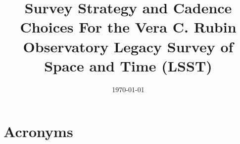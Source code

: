 \documentclass[modern]{aastex62}
\begin{document}


\date{\today}
\title{Survey Strategy and Cadence Choices For the Vera C. Rubin Observatory Legacy Survey of Space and Time (LSST)}



\tableofcontents

\clearpage


\clearpage

\clearpage

\clearpage

\clearpage

\clearpage

\clearpage


%

\clearpage



\clearpage
\section{Acronyms} \label{sec:acronyms}

\end{document}
